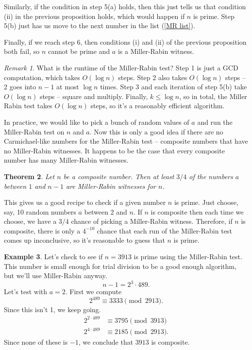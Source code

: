 \documentclass[12pt]{article}
\theoremstyle{plain}
\newtheorem{theorem}{Theorem}[section]
\theoremstyle{definition}
\newtheorem{example}[theorem]{Example}
\theoremstyle{remark}
\newtheorem{remark}[theorem]{Remark}
\begin{document}
Similarly, if the condition in step 5(a) holds, then this just tells us that condition (ii) in the previous proposition holds, which would happen if $n$ is prime.
Step 5(b) just has us move to the next number in the list (\ref{MR list}).

Finally, if we reach step 6, then conditions (i) and (ii) of the previous proposition both fail, so $n$ cannot be prime and $a$ is a Miller-Rabin witness.

\begin{remark}
    What is the runtime of the Miller-Rabin test?
    Step 1 is just a GCD computation, which takes $O(\log n)$ steps.
    Step 2 also takes $O(\log n)$ steps -- 2 goes into $n-1$ at most $\log n$ times.
    Step 3 and each iteration of step 5(b) take $O(\log n)$ steps -- square and multiply.
    Finally, $k\leq \log n$, so in total, the Miller Rabin test takes $O(\log n)$ steps, so it's a reasonably efficient algorithm.
\end{remark}

In practice, we would like to pick a bunch of random values of $a$ and run the Miller-Rabin test on $n$ and $a$.
Now this is only a good idea if there are no Carmichael-like numbers for the Miller-Rabin test -- composite numbers that have no Miller-Rabin witnesses.
It happens to be the case that every composite number has many Miller-Rabin witnesses.
\begin{theorem}
    Let $n$ be a composite number.
    Then at least $3/4$ of the numbers $a$ between $1$ and $n-1$ are Miller-Rabin witnesses for $n$.
\end{theorem}

This gives us a good recipe to check if a given number $n$ is prime.
Just choose, say, 10 random numbers $a$ between 2 and $n$.
If $n$ is composite then each time we choose, we have a $3/4$ chance of picking a Miller-Rabin witness.
Therefore, if $n$ is composite, there is only a $4^{-10}$ chance that each run of the Miller-Rabin test comes up inconclusive, so it's reasonable to guess that $n$ is prime.

\begin{example}
    Let's check to see if $n= 3913$ is prime using the Miller-Rabin test.
    This number is small enough for trial division to be a good enough algorithm, but we'll use Miller-Rabin anyway.
    \[
        n-1 = 2^3\cdot 489.
    \]
    Let's test with $a=2$.
    First we compute
    \[
        2^{489} \equiv 3333\pmod{2913}.
    \]
    Since this isn't 1, we keep going.
    \begin{align*}
        2^{2\cdot 489} &\equiv 3795\pmod{3913}\\
        2^{4\cdot 489} &\equiv 2185\pmod{2913}.
    \end{align*}
    Since none of these is $-1$, we conclude that $3913$ is composite.
\end{example}
\end{document}
